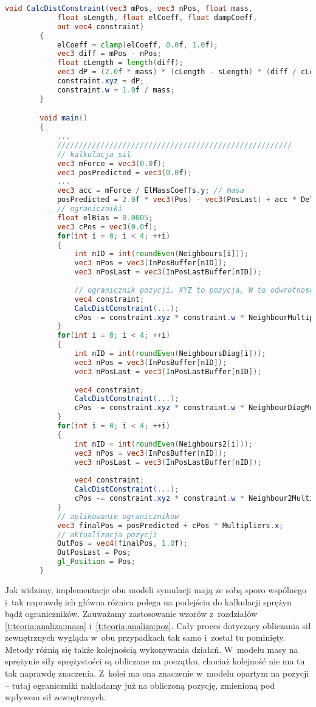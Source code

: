 		
		\begin{lstlisting}[language=GLSL]
		void CalcDistConstraint(vec3 mPos, vec3 nPos, float mass, 
			float sLength, float elCoeff, float dampCoeff,
			out vec4 constraint)
		{
			elCoeff = clamp(elCoeff, 0.0f, 1.0f);
			vec3 diff = mPos - nPos;
			float cLength = length(diff);
			vec3 dP = (2.0f * mass) * (cLength - sLength) * (diff / cLength) * elCoeff;
			constraint.xyz = dP;
			constraint.w = 1.0f / mass;
		}

		void main()
		{
			...
			//////////////////////////////////////////////////////
			// kalkulacja sil
			vec3 mForce = vec3(0.0f);
			vec3 posPredicted = vec3(0.0f);
			...
			vec3 acc = mForce / ElMassCoeffs.y;	// masa
			posPredicted = 2.0f * vec3(Pos) - vec3(PosLast) + acc * DeltaTime * DeltaTime;
			// ograniczniki
			float elBias = 0.0005;
			vec3 cPos = vec3(0.0f);
			for(int i = 0; i < 4; ++i)
			{
				int nID = int(roundEven(Neighbours[i]));
				vec3 nPos = vec3(InPosBuffer[nID]);
				vec3 nPosLast = vec3(InPosLastBuffer[nID]);
				
				// ogranicznik pozycji. XYZ to pozycja, W to odwrotnosc masy
				vec4 constraint;
				CalcDistConstraint(...);
				cPos -= constraint.xyz * constraint.w * NeighbourMultipliers[i];
			}
			for(int i = 0; i < 4; ++i)
			{
				int nID = int(roundEven(NeighboursDiag[i]));
				vec3 nPos = vec3(InPosBuffer[nID]);
				vec3 nPosLast = vec3(InPosLastBuffer[nID]);
				
				vec4 constraint;
				CalcDistConstraint(...);
				cPos -= constraint.xyz * constraint.w * NeighbourDiagMultipliers[i];
			}
			for(int i = 0; i < 4; ++i)
			{
				int nID = int(roundEven(Neighbours2[i]));
				vec3 nPos = vec3(InPosBuffer[nID]);
				vec3 nPosLast = vec3(InPosLastBuffer[nID]);
				
				vec4 constraint;
				CalcDistConstraint(...);
				cPos -= constraint.xyz * constraint.w * Neighbour2Multipliers[i];
			}
			// aplikowanie ogranicznikow
			vec3 finalPos = posPredicted + cPos * Multipliers.x;
			// aktualizacja pozycji
			OutPos = vec4(finalPos, 1.0f);
			OutPosLast = Pos;
			gl_Position = Pos;
		}	
		\end{lstlisting}
		
		Jak widzimy, implementacje obu modeli symulacji mają ze sobą sporo wspólnego i~tak naprawdę ich główna różnica polega na podejściu do kalkulacji sprężyn bądź ograniczników. Zauważamy zastosowanie wzorów z~rozdziałów \ref{t:teoria:analiza:masa} i~\ref{t:teoria:analiza:poz}. Cały proces dotyczący obliczania sił zewnętrznych wygląda w~obu przypadkach tak samo i~został tu pominięty. Metody różnią się także kolejnością wykonywania działań. W~modelu masy na sprężynie siły sprężystości są obliczane na początku, chociaż kolejność nie ma tu tak naprawdę znaczenia. Z~kolei ma ona znaczenie w~modelu opartym na pozycji -- tutaj ograniczniki nakładamy już na obliczoną pozycję, zmienioną pod wpływem sił zewnętrznych.
		
